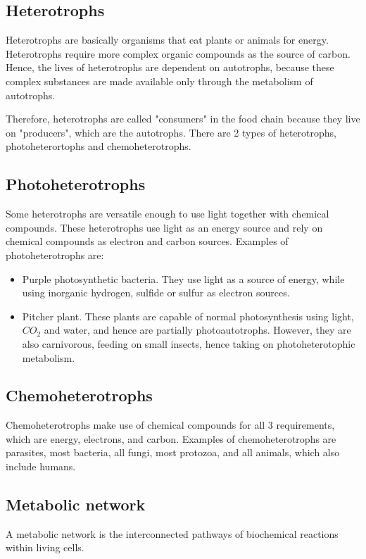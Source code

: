 \documentclass[11pt]{article}
\begin{document}
\subsection{Heterotrophs}
\label{sec:orgccdedae}
Heterotrophs are basically organisms that eat plants or animals for energy. Heterotrophs require more complex organic compounds as the source of carbon. Hence, the lives of heterotrophs are dependent on autotrophs, because these complex substances are made available only through the metabolism of autotrophs.


Therefore, heterotrophs are called "consumers" in the food chain because they live on "producers", which are the autotrophs. There are 2 types of heterotrophs, photoheterortophs and chemoheterotrophs.
\subsection{Photoheterotrophs}
\label{sec:org1186d9f}
Some heterotrophs are versatile enough to use light together with chemical compounds. These heterotrophs use light as an energy source and rely on chemical compounds as electron and carbon sources. Examples of photoheterotrophs are:
\begin{itemize}
\item Purple photosynthetic bacteria. They use light as a source of energy, while using inorganic hydrogen, sulfide or sulfur as electron sources.
\item Pitcher plant. These plants are capable of normal photosynthesis using light, \(CO_2\) and water, and hence are partially photoautotrophs. However, they are also carnivorous, feeding on small insects, hence taking on photoheterotophic metabolism.
\end{itemize}
\subsection{Chemoheterotrophs}
\label{sec:org09ad909}
Chemoheterotrophs make use of chemical compounds for all 3 requirements, which are energy, electrons, and carbon. Examples of chemoheterotrophs are parasites, most bacteria, all fungi, most protozoa, and all animals, which also include humans.
\subsection{Metabolic network}
\label{sec:org6f28a5d}
A metabolic network is the interconnected pathways of biochemical reactions within living cells.
\end{document}
